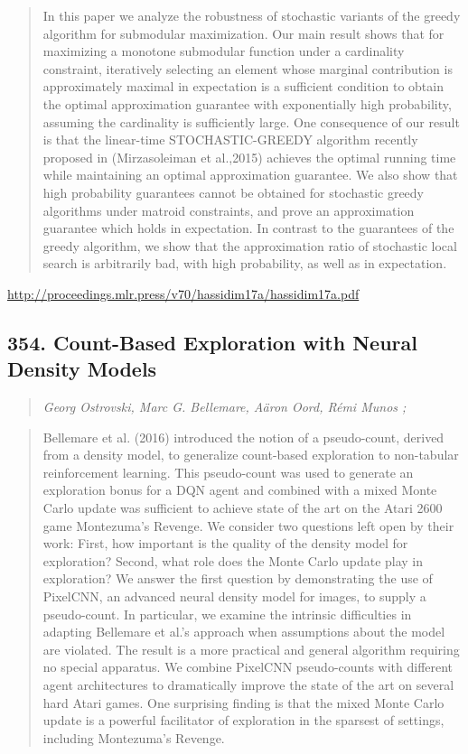 \documentclass{article}
\begin{document}
\begin{quote}
    In this paper we analyze the robustness of stochastic variants of the greedy algorithm for submodular maximization. Our main result shows that for maximizing a monotone submodular function under a cardinality constraint, iteratively selecting an element whose marginal contribution is approximately maximal in expectation is a sufficient condition to obtain the optimal approximation guarantee with exponentially high probability, assuming the cardinality is sufficiently large. One consequence of our result is that the linear-time STOCHASTIC-GREEDY algorithm recently proposed in (Mirzasoleiman et al.,2015) achieves the optimal running time while maintaining an optimal approximation guarantee. We also show that high probability guarantees cannot be obtained for stochastic greedy algorithms under matroid constraints, and prove an approximation guarantee which holds in expectation. In contrast to the guarantees of the greedy algorithm, we show that the approximation ratio of stochastic local search is arbitrarily bad, with high probability, as well as in expectation.  \end{quote}

\href{http://proceedings.mlr.press/v70/hassidim17a/hassidim17a.pdf}{http://proceedings.mlr.press/v70/hassidim17a/hassidim17a.pdf}

\subsection{354. Count-Based Exploration with Neural Density Models}

\begin{quote}
\footnotesize{\textit{Georg Ostrovski, Marc G. Bellemare, Aäron Oord, Rémi Munos ;}}
\end{quote}

\begin{quote}
    Bellemare et al. (2016) introduced the notion of a pseudo-count, derived from a density model, to generalize count-based exploration to non-tabular reinforcement learning. This pseudo-count was used to generate an exploration bonus for a DQN agent and combined with a mixed Monte Carlo update was sufficient to achieve state of the art on the Atari 2600 game Montezuma’s Revenge. We consider two questions left open by their work: First, how important is the quality of the density model for exploration? Second, what role does the Monte Carlo update play in exploration? We answer the first question by demonstrating the use of PixelCNN, an advanced neural density model for images, to supply a pseudo-count. In particular, we examine the intrinsic difficulties in adapting Bellemare et al.’s approach when assumptions about the model are violated. The result is a more practical and general algorithm requiring no special apparatus. We combine PixelCNN pseudo-counts with different agent architectures to dramatically improve the state of the art on several hard Atari games. One surprising finding is that the mixed Monte Carlo update is a powerful facilitator of exploration in the sparsest of settings, including Montezuma’s Revenge.  \end{quote}
\end{document}
